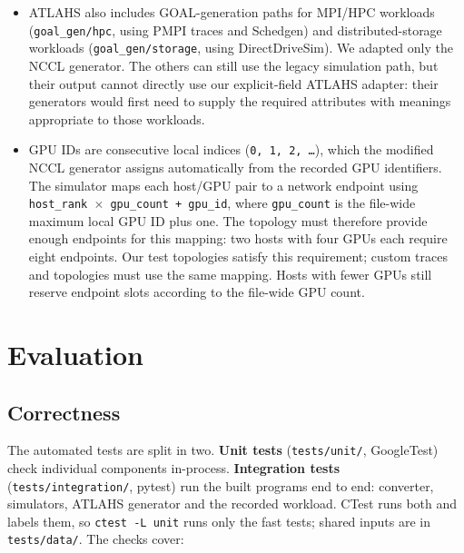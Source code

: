 \documentclass[10pt,a4paper]{article}
\begin{document}
\begin{itemize}
\item ATLAHS also includes GOAL-generation paths for MPI/HPC workloads (\texttt{goal\_\allowbreak{}gen/\allowbreak{}hpc}, using PMPI traces and Schedgen) and distributed-storage workloads (\texttt{goal\_\allowbreak{}gen/\allowbreak{}storage}, using DirectDriveSim). We adapted only the NCCL generator. The others can still use the legacy simulation path, but their output cannot directly use our explicit-field ATLAHS adapter: their generators would first need to supply the required attributes with meanings appropriate to those workloads.
\item GPU IDs are consecutive local indices (\texttt{0, 1, 2, \ldots{}}), which the modified NCCL generator assigns automatically from the recorded GPU identifiers. The simulator maps each host/GPU pair to a network endpoint using \texttt{host\_\allowbreak{}rank \(\times\) gpu\_\allowbreak{}count + gpu\_\allowbreak{}id}, where \texttt{gpu\_\allowbreak{}count} is the file-wide maximum local GPU ID plus one. The topology must therefore provide enough endpoints for this mapping: two hosts with four GPUs each require eight endpoints. Our test topologies satisfy this requirement; custom traces and topologies must use the same mapping. Hosts with fewer GPUs still reserve endpoint slots according to the file-wide GPU count.
\end{itemize}

\hypertarget{evaluation}{}
\section{Evaluation}

\hypertarget{correctness}{}
\subsection{Correctness}

The automated tests are split in two. \textbf{Unit tests} (\texttt{tests/\allowbreak{}unit/}, GoogleTest) check individual components in-process. \textbf{Integration tests} (\texttt{tests/\allowbreak{}integration/}, pytest) run the built programs end to end: converter, simulators, ATLAHS generator and the recorded workload. CTest runs both and labels them, so \texttt{ctest -\allowbreak{}L unit} runs only the fast tests; shared inputs are in \texttt{tests/\allowbreak{}data/}. The checks cover:
\end{document}
